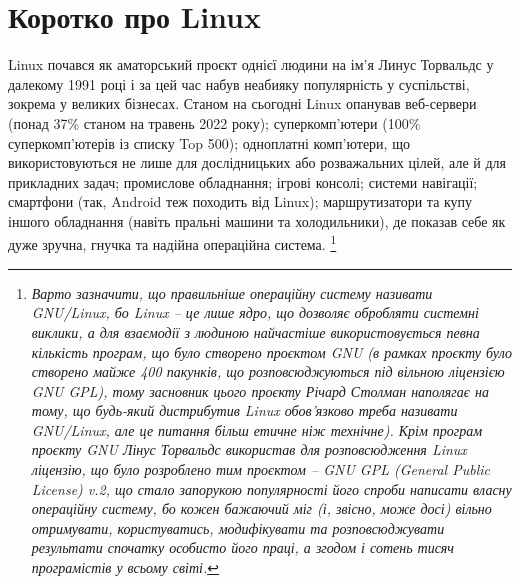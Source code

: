 \documentclass[10pt,a4paper]{fancyhandout}
\begin{document}
\section{Коротко про Linux}
Linux почався як аматорський проєкт однієї людини на ім'я Линус Торвальдс у далекому 1991 році і за цей час набув неабияку популярність у суспільстві, зокрема у великих бізнесах. Станом на сьогодні Linux опанував веб-сервери (понад 37\% станом на травень 2022 року); суперкомп'ютери (100\% суперкомп'ютерів із списку Top 500); одноплатні комп'ютери, що використовуються не лише для дослідницьких або розважальних цілей, але й для прикладних задач; промислове обладнання; ігрові консолі; системи навігації; смартфони (так, Android теж походить від Linux); маршрутизатори та купу іншого обладнання (навіть пральні машини та холодильники), де показав себе як дуже зручна, гнучка та надійна операційна система.
\footnote{\textit{Варто зазначити, що правильніше операційну систему називати GNU/Linux, бо Linux -- це лише ядро, що дозволяє обробляти системні виклики, а для взаємодії з людиною найчастіше використовується певна кількість програм, що було створено проєктом GNU (в рамках проєкту було створено майже 400 пакунків, що розповсюджуються під вільною ліцензією GNU GPL), тому засновник цього проєкту Річард Столман наполягає на тому, що будь-який дистрибутив Linux обов'язково треба називати GNU/Linux, але це питання більш етичне ніж технічне). Крім програм проєкту GNU Лінус Торвальдс використав для розповсюдження Linux ліцензію, що було розроблено тим проєктом -- GNU GPL (General Public License) v.2, що стало запорукою популярності його спроби написати власну операційну систему, бо кожен бажаючий міг (і, звісно, може досі) вільно отримувати, користуватись, модифікувати та розповсюджувати результати спочатку особисто його праці, а згодом і сотень тисяч програмістів у всьому світі.}}
\goodbreak
\end{document}
